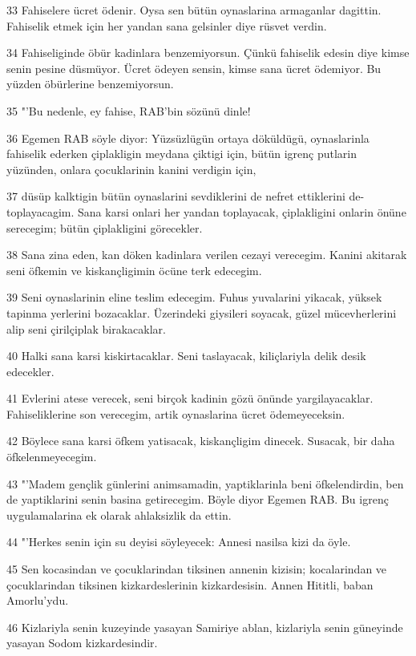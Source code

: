 \par 33 Fahiselere ücret ödenir. Oysa sen bütün oynaslarina armaganlar dagittin. Fahiselik etmek için her yandan sana gelsinler diye rüsvet verdin.
\par 34 Fahiseliginde öbür kadinlara benzemiyorsun. Çünkü fahiselik edesin diye kimse senin pesine düsmüyor. Ücret ödeyen sensin, kimse sana ücret ödemiyor. Bu yüzden öbürlerine benzemiyorsun.
\par 35 "'Bu nedenle, ey fahise, RAB'bin sözünü dinle!
\par 36 Egemen RAB söyle diyor: Yüzsüzlügün ortaya döküldügü, oynaslarinla fahiselik ederken çiplakligin meydana çiktigi için, bütün igrenç putlarin yüzünden, onlara çocuklarinin kanini verdigin için,
\par 37 düsüp kalktigin bütün oynaslarini sevdiklerini de nefret ettiklerini de- toplayacagim. Sana karsi onlari her yandan toplayacak, çiplakligini onlarin önüne serecegim; bütün çiplakligini görecekler.
\par 38 Sana zina eden, kan döken kadinlara verilen cezayi verecegim. Kanini akitarak seni öfkemin ve kiskançligimin öcüne terk edecegim.
\par 39 Seni oynaslarinin eline teslim edecegim. Fuhus yuvalarini yikacak, yüksek tapinma yerlerini bozacaklar. Üzerindeki giysileri soyacak, güzel mücevherlerini alip seni çirilçiplak birakacaklar.
\par 40 Halki sana karsi kiskirtacaklar. Seni taslayacak, kiliçlariyla delik desik edecekler.
\par 41 Evlerini atese verecek, seni birçok kadinin gözü önünde yargilayacaklar. Fahiseliklerine son verecegim, artik oynaslarina ücret ödemeyeceksin.
\par 42 Böylece sana karsi öfkem yatisacak, kiskançligim dinecek. Susacak, bir daha öfkelenmeyecegim.
\par 43 "'Madem gençlik günlerini animsamadin, yaptiklarinla beni öfkelendirdin, ben de yaptiklarini senin basina getirecegim. Böyle diyor Egemen RAB. Bu igrenç uygulamalarina ek olarak ahlaksizlik da ettin.
\par 44 "'Herkes senin için su deyisi söyleyecek: Annesi nasilsa kizi da öyle.
\par 45 Sen kocasindan ve çocuklarindan tiksinen annenin kizisin; kocalarindan ve çocuklarindan tiksinen kizkardeslerinin kizkardesisin. Annen Hititli, baban Amorlu'ydu.
\par 46 Kizlariyla senin kuzeyinde yasayan Samiriye ablan, kizlariyla senin güneyinde yasayan Sodom kizkardesindir.
